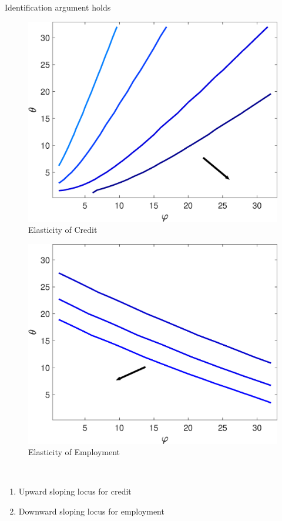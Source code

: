 \documentclass[english,xcolor=svgnames]{beamer}
\begin{document}
\begin{frame}{Identification argument holds}\label{locus_numerical}
\begin{minipage}{0.4\textwidth}
\begin{figure}
\centering
\caption*{Elasticity of Credit}
\includegraphics[scale=0.24]{Figures/huber_credit_varphi_theta_contour.eps}
\end{figure}
\end{minipage}\qquad
\begin{minipage}{0.4\textwidth}
\begin{figure}
\centering
\caption*{Elasticity of Employment}
\includegraphics[scale=0.24]{Figures/huber_varphi_theta_contour.eps}
\end{figure}
\end{minipage}\\
\begin{enumerate}
\item Upward sloping locus for credit
\item Downward sloping locus for employment
\end{enumerate}
\hyperlink{identification_theory}{}
\hyperlink{locus_colors}{}
\end{frame}
\end{document}
